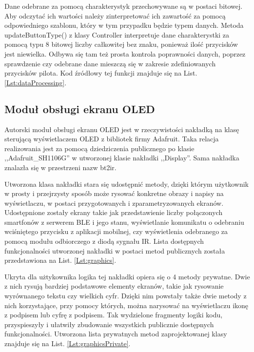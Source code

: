 \documentclass[12pt,twoside,draft]{article}
\begin{document}


Dane odebrane za pomocą charakterystyk przechowywane są w postaci bitowej. Aby odczytać ich wartości należy zinterpretować ich zawartość za pomocą odpowiedniego szablonu, który w tym przypadku będzie typem danych. Metoda updateButtonType() z klasy Controller interpretuje dane charakterystki za pomocą typu 8 bitowej liczby całkowitej bez znaku, ponieważ ilość przycisków jest niewielka. Odbywa się tam też prosta kontrola poprawności danych, poprzez sprawdzenie czy odebrane dane mieszczą się w zakresie zdefiniowanych przycisków pilota. Kod źródłowy tej funkcji znajduje się na List. \ref*{Lst:dataProcessing}.



\subsection{Moduł obsługi ekranu OLED}
Autorski moduł obsługi ekranu OLED jest w rzeczywistości nakładką na klasę sterującą wyświetlaczem OLED z bibliotek firmy Adafruit. Taka relacja realizowania jest za pomocą dziedziczenia publicznego po klasie ,,Adafruit\_SH1106G'' w utworzonej klasie nakładki ,,Display''. Sama nakładka znalazła się w przestrzeni nazw bt2ir.

Utworzona klasa nakładki stara się udostępnić metody, dzięki którym użytkownik w prosty i przejrzysty sposób może rysować konkretne obrazy i napisy na wyświetlaczu, w postaci przygotowanych i zparametryzowanych ekranów. Udostępnione zostały ekrany takie jak przedstawienie liczby połączonych smartfonów z serwerem BLE i jego stanu, wyświetlanie komunikatu o odebraniu wciśniętego przycisku z aplikacji mobilnej, czy wyświetlenia odebranego za pomocą modułu odbiorczego z diodą sygnału IR. Lista dostępnych funkcjonalności utworzonej nakładki w postaci metod publicznych została przedstawiona na List. \ref*{Lst:graphics}.



Ukryta dla użtykownika logika tej nakładki opiera się o 4 metody prywatne. Dwie z nich rysują bardziej podstawowe elementy ekranów, takie jak rysowanie wyrównanego tekstu czy wielkich cyfr. Dzięki nim powstały także dwie metody z nich korzystające, przy pomocy których, można narysować na wyświetlaczu ikonę z podpisem lub cyfrę z podpisem. Tak wydzielone fragmenty logiki kodu, przyspieszyły i ułatwiły zbudowanie wszystkich publicznie dostępnych funkcjonalności. Utworzona lista prywatnych metod zaprojektowanej klasy znajduje się na List. \ref*{Lst:graphicsPrivate}.
\end{document}
